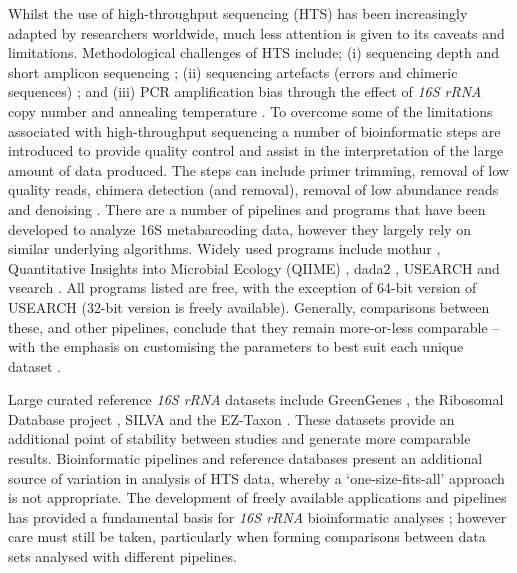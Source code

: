 \documentclass[a4paper, nobind]{templates/ociamthesis}
\begin{document}
Whilst the use of high-throughput sequencing (HTS) has been increasingly adapted by researchers worldwide, much less attention is given to its caveats and limitations. Methodological challenges of HTS include; (i) sequencing depth and short amplicon sequencing \autocite{gihringMassivelyParallelRRNA2012,houImpactNextgenerationSequencing2013,simsSequencingDepthCoverage2014}; (ii) sequencing artefacts (errors and chimeric sequences) \autocite{kuninWrinklesRareBiosphere2010,haasChimeric16SRRNA2011}; and (iii) PCR amplification bias through the effect of \emph{16S rRNA} copy number \autocite{ahnEffectsPCRCycle2012} and annealing temperature \autocite{suzukiBiasCausedTemplate1996}.
To overcome some of the limitations associated with high-throughput sequencing a number of bioinformatic steps are introduced to provide quality control and assist in the interpretation of the large amount of data produced.
The steps can include primer trimming, removal of low quality reads, chimera detection (and removal), removal of low abundance reads and denoising \autocite{edgarSearchClusteringOrders2010,kuninWrinklesRareBiosphere2010,haasChimeric16SRRNA2011,edgarUNOISE2ImprovedErrorcorrection2016}.
There are a number of pipelines and programs that have been developed to analyze 16S metabarcoding data, however they largely rely on similar underlying algorithms.
Widely used programs include mothur \autocite{schlossIntroducingMothurOpensource2009}, Quantitative Insights into Microbial Ecology (QIIME) \autocite{caporasoQIIMEAllowsAnalysis2010}, dada2 \autocite{callahanDADA2HighresolutionSample2016}, USEARCH \autocite{edgarSearchClusteringOrders2010} and vsearch \autocite{rognesVSEARCHVersatileOpen2016}.
All programs listed are free, with the exception of 64-bit version of USEARCH (32-bit version is freely available).
Generally, comparisons between these, and other pipelines, conclude that they remain more-or-less comparable -- with the emphasis on customising the parameters to best suit each unique dataset \autocite{nilakantaReviewSoftwareAnalyzing2014,plummerComparisonThreeBioinformatics2015,forsterComparisonThreeClustering2016}.

Large curated reference \emph{16S rRNA} datasets include GreenGenes \autocite{desantisGreengenesChimerachecked16S2006}, the Ribosomal Database project \autocite{coleRibosomalDatabaseProject2009}, SILVA \autocite{pruesseSILVAComprehensiveOnline2007} and the EZ-Taxon \autocite{chunEzTaxonWebbasedTool2007}.
These datasets provide an additional point of stability between studies and generate more comparable results.
Bioinformatic pipelines and reference databases present an additional source of variation in analysis of HTS data, whereby a `one-size-fits-all' approach is not appropriate.
The development of freely available applications and pipelines has provided a fundamental basis for \emph{16S rRNA} bioinformatic analyses \autocite{schlossIntroducingMothurOpensource2009,caporasoQIIMEAllowsAnalysis2010,edgarSearchClusteringOrders2010}; however care must still be taken, particularly when forming comparisons between data sets analysed with different pipelines.
\end{document}
